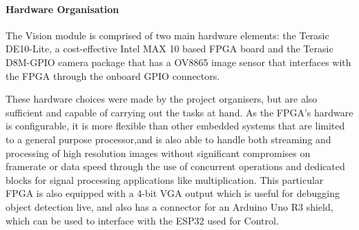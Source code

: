 \documentclass[a4paper]{article}
\begin{document}
\paragraph*{Hardware Organisation}
\vspace{-6pt}
The Vision module is comprised of two main hardware elements: 
    the Terasic DE10-Lite, a cost-effective Intel MAX 10 based FPGA board 
    \cite{TerasicDE10Web} 
    and the Terasic D8M-GPIO camera package that has a OV8865 image sensor \cite{TerasicD8MWeb}
that interfaces with the FPGA through the onboard GPIO connectors. 

These hardware choices were made by the project organisers, 
but are also sufficient and capable of carrying out the tasks at hand. 
As the FPGA's hardware is configurable, 
it is more flexible than other embedded systems 
that are limited to a general purpose processor,and 
is also able to handle both streaming and processing of high resolution images
without significant compromises on framerate or data speed 
through the use of concurrent operations and dedicated blocks 
for signal processing applications like multiplication.
This particular FPGA is also equipped with a 4-bit VGA output 
which is useful for debugging object detection live, 
and also has a connector for an Arduino Uno R3 shield, \cite{TerasicDE10Web} 
which can be used to interface with the ESP32 used for Control.  
\end{document}
